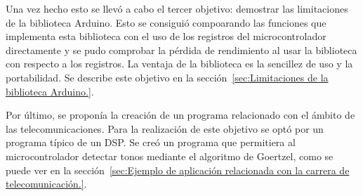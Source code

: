 Una vez hecho esto se llevó a cabo el tercer objetivo: demostrar las limitaciones de la biblioteca Arduino. Esto se consiguió compoarando las funciones que implementa esta biblioteca con el uso de los registros del microcontrolador directamente y se pudo comprobar la pérdida de rendimiento al usar la biblioteca con respecto a los registros. La ventaja de la biblioteca es la sencillez de uso y la portabilidad. Se describe este objetivo en la sección~\ref{sec:Limitaciones de la biblioteca Arduino.}.

Por último, se proponía la creación de un programa relacionado con el ámbito de las telecomunicaciones. Para la realización de este objetivo se optó por un programa típico de un DSP. Se creó un programa que permitiera al microcontrolador detectar tonos mediante el algoritmo de Goertzel, como se puede ver en la sección~\ref{sec:Ejemplo de aplicación relacionada con la carrera de telecomunicación.}.

